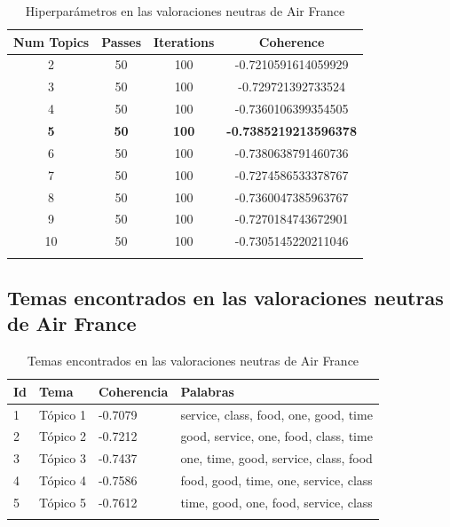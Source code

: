 \documentclass{report}
\begin{document}
                \label{tab:hiperparametros_air_france_neutras}
                \begin{longtable}{|c|c|c|c|}
                    \hline
                    \textbf{Num Topics} & \textbf{Passes} & \textbf{Iterations} & \textbf{Coherence} \\
                    \hline
                    2 & 50 & 100 & -0.7210591614059929 \\
                    \hline
                    3 & 50 & 100 & -0.729721392733524 \\
                    \hline
                    4 & 50 & 100 & -0.7360106399354505 \\
                    \hline
                    \textbf{5} & \textbf{50} & \textbf{100} & \textbf{-0.7385219213596378} \\
                    \hline
                    6 & 50 & 100 & -0.7380638791460736 \\
                    \hline
                    7 & 50 & 100 & -0.7274586533378767 \\
                    \hline
                    8 & 50 & 100 & -0.7360047385963767 \\
                    \hline
                    9 & 50 & 100 & -0.7270184743672901 \\
                    \hline
                    10 & 50 & 100 & -0.7305145220211046 \\
                    \hline
                    \caption{Hiperparámetros en las valoraciones neutras de Air France}
                \end{longtable}
            \clearpage\subsection{Temas encontrados en las valoraciones neutras de Air France}
                \label{tab:temas_air_france_neutras}
                \begin{longtable}{|p{1cm}|p{4cm}|p{4cm}|p{6cm}|}
                    \hline
                    \textbf{Id} & \textbf{Tema} & \textbf{Coherencia} & \textbf{Palabras} \\
                    \hline
                    1 & Tópico 1 & -0.7079 & service, class, food, one, good, time \\
                    \hline
                    2 & Tópico 2 & -0.7212 & good, service, one, food, class, time \\
                    \hline
                    3 & Tópico 3 & -0.7437 & one, time, good, service, class, food \\
                    \hline
                    4 & Tópico 4 & -0.7586 & food, good, time, one, service, class \\
                    \hline
                    5 & Tópico 5 & -0.7612 & time, good, one, food, service, class \\
                    \hline
                    \caption{Temas encontrados en las valoraciones neutras de Air France}
                \end{longtable}
\end{document}
